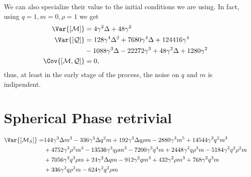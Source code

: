 We can also specialize their value to the initial conditions we are using.
In fact, using \(q=1, m=0, \rho=1\) we get
\[\begin{split}
  \Var{[\mathcal{M}]} &= 4 \gamma ^2 \Delta +48 \gamma ^2 \\
  \Var{[\mathcal{Q}]} &= 128 \gamma ^4 \Delta ^2+7680 \gamma ^4 \Delta +124416 \gamma ^4 \\
                      &-1088 \gamma ^3 \Delta -22272 \gamma ^3+48 \gamma ^2 \Delta +1280 \gamma ^2 \\
  \Cov{[\mathcal{M},\mathcal{Q}]} &= 0,
\end{split}\]
thus, at least in the early stage of the process, the noise on \(q\) and \(m\) is indipendent.

\section{Spherical Phase retrivial}
\[\begin{split}
  \Var{[\mathcal{M}_S]} =& 144 \gamma ^3 \Delta  m^3-336 \gamma ^3 \Delta  q^2 m+192 \gamma ^3 \Delta  q \rho m-2880 \gamma ^3 m^5+14544 \gamma ^3 q^2 m^3 \\
                         &+4752 \gamma ^3 \rho^2 m^3-13536 \gamma ^3 q \rho m^3-7200 \gamma ^3 q^4 m+2448 \gamma ^3 q \rho^3 m-5184 \gamma ^3 q^2 \rho^2 m \\
                         &+7056 \gamma ^3 q^3 \rho m+24 \gamma ^2 \Delta  q m-912 \gamma ^2 q m^3+432 \gamma ^2 \rho m^3+768 \gamma ^2 q^3 m \\
                         &+336 \gamma ^2 q \rho^2 m-624 \gamma ^2 q^2 \rho m
\end{split}\]